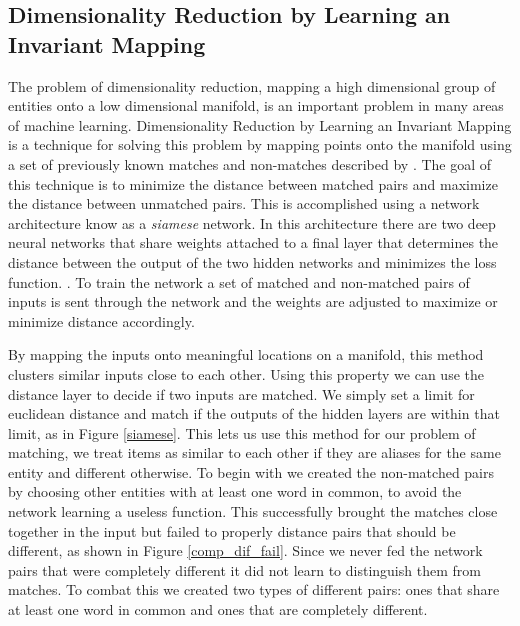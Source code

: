 \subsection{Dimensionality Reduction by Learning an Invariant Mapping}

The problem of dimensionality reduction, mapping a high dimensional group of entities onto a low dimensional manifold, is an important problem in many areas of machine learning. Dimensionality Reduction by Learning an Invariant Mapping is a technique for solving this problem by mapping points onto the manifold using a set of previously known matches and non-matches described by \cite{Hasdell:Siamese}. The goal of this technique is to minimize the distance between matched pairs and maximize the distance between unmatched pairs. This is accomplished using a network architecture know as a \textit{siamese} network. In this architecture there are two deep neural networks that share weights attached to a final layer that determines the distance between the output of the two hidden networks and minimizes the loss function. . To train the network a set of matched and non-matched pairs of inputs is sent through the network and the weights are adjusted to maximize or minimize distance accordingly.

By mapping the inputs onto meaningful locations on a manifold, this method clusters similar inputs close to each other. Using this property we can use the distance layer to decide if two inputs are matched. We simply set a limit for euclidean distance and match if the outputs of the hidden layers are within that limit, as in Figure \ref{siamese}. This lets us use this method for our problem of matching, we treat items as similar to each other if they are aliases for the same entity and different otherwise. To begin with we created the non-matched pairs by choosing other entities with at least one word in common, to avoid the network learning a useless function. This successfully brought the matches close together in the input but failed to properly distance pairs that should be different, as shown in Figure \ref{comp_dif_fail}. Since we never fed the network pairs that were completely different it did not learn to distinguish them from matches. To combat this we created two types of different pairs: ones that share at least one word in common and ones that are completely different.

